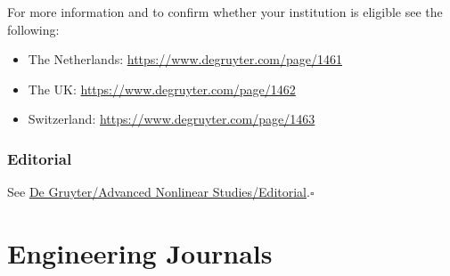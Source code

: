\documentclass{book}
\numberwithin{equation}{section}
\begin{document}
For more information and to confirm whether your institution is eligible see the following:
\begin{itemize}
    \item The Netherlands: \url{https://www.degruyter.com/page/1461}
    \item The UK: \url{https://www.degruyter.com/page/1462}
    \item Switzerland: \url{https://www.degruyter.com/page/1463}
\end{itemize}

\section{Editorial}
See \href{https://www.degruyter.com/journal/key/ANS/html}{De Gruyter/Advanced Nonlinear Studies/Editorial}.\hfill$\square$


\part{Engineering Journals}




\printbibliography[heading=bibintoc]
\end{document}
